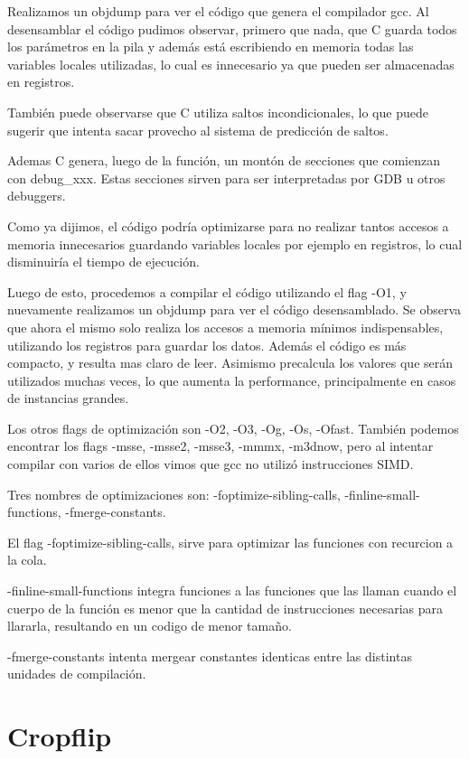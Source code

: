 \documentclass[a4paper]{article}
\begin{document}
Realizamos un objdump para ver el código que genera el compilador gcc. Al desensamblar el código pudimos observar, primero que nada, que C guarda todos los parámetros en la pila y además está escribiendo en memoria todas las variables locales utilizadas, lo cual es innecesario ya que pueden ser almacenadas en registros.

También puede observarse que C utiliza saltos incondicionales, lo que puede sugerir que intenta sacar provecho al sistema de predicción de saltos.

Ademas C genera, luego de la función, un montón de secciones que comienzan con debug_xxx. Estas secciones sirven para ser interpretadas por GDB u otros debuggers.

Como ya dijimos, el código podría optimizarse para no realizar tantos accesos a memoria innecesarios guardando variables locales por ejemplo en registros, lo cual disminuiría el tiempo de ejecución.

Luego de esto, procedemos a compilar el código utilizando el flag -O1, y nuevamente realizamos un objdump para ver el código desensamblado. Se observa que ahora el mismo solo realiza los accesos a memoria mínimos indispensables, utilizando los registros para guardar los datos. Además el código es más compacto, y resulta mas claro de leer. Asimismo precalcula los valores que serán utilizados muchas veces, lo que aumenta la performance, principalmente en casos de instancias grandes.

Los otros flags de optimización son -O2, -O3, -Og, -Os, -Ofast. También podemos encontrar los flags -msse, -msse2, -msse3, -mmmx, -m3dnow, pero al intentar compilar con varios de ellos vimos que gcc no utilizó instrucciones SIMD.

Tres nombres de optimizaciones son: -foptimize-sibling-calls, -finline-small-functions, -fmerge-constants.

El flag -foptimize-sibling-calls, sirve para optimizar las funciones con recurcion a la cola.

-finline-small-functions integra funciones a las funciones que las llaman cuando el cuerpo de la función es menor que la cantidad de instrucciones necesarias para llararla, resultando en un codigo de menor tamaño.

-fmerge-constants intenta mergear constantes identicas entre las distintas unidades de compilación.

\newpage

\section{Cropflip}
\end{document}
